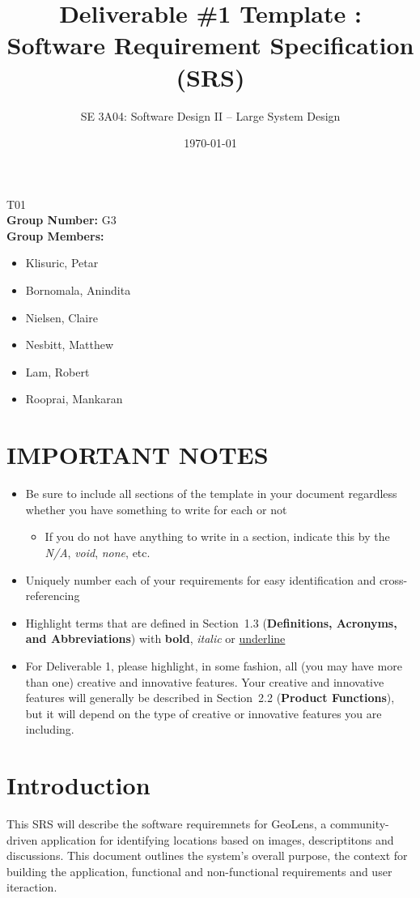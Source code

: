 \documentclass[]{article}
\title{Deliverable \#1 Template : Software Requirement Specification (SRS)}
\author{SE 3A04: Software Design II -- Large System Design}
\date{\today}
\begin{document}
\maketitle	
{} T01\\
{\bf Group Number:} G3 \\
{\bf Group Members:} 
\begin{itemize}
	\item Klisuric, Petar
    \item Bornomala, Anindita
    \item Nielsen, Claire
    \item Nesbitt, Matthew
    \item Lam, Robert 
    \item Rooprai, Mankaran
\end{itemize}

\section*{IMPORTANT NOTES}
\begin{itemize}
	\item Be sure to include all sections of the template in your document regardless whether you have something to write for each or not
	\begin{itemize}
		\item If you do not have anything to write in a section, indicate this by the \emph{N/A}, \emph{void}, \emph{none}, etc.
	\end{itemize}
	\item Uniquely number each of your requirements for easy identification and cross-referencing
	\item Highlight terms that are defined in Section~1.3 (\textbf{Definitions, Acronyms, and Abbreviations}) with \textbf{bold}, \emph{italic} or \underline{underline}
	\item For Deliverable 1, please highlight, in some fashion, all (you may have more than one) creative and innovative features. Your creative and innovative features will generally be described in Section~2.2 (\textbf{Product Functions}), but it will depend on the type of creative or innovative features you are including.
\end{itemize}

\newpage
\section{Introduction}
\label{sec:introduction}
This SRS will describe the software requiremnets for GeoLens, a community-driven application for identifying
locations based on images, descriptitons and discussions. This document outlines the system's overall purpose, the context for building the application,
functional and non-functional requirements and user iteraction.
\end{document}
